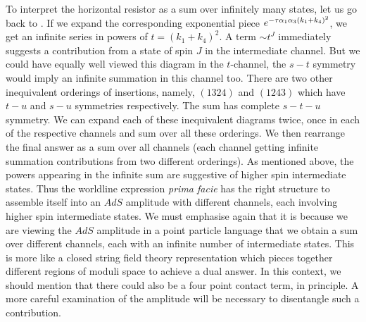 To interpret the horizontal resistor as a sum over infinitely many states, let us go back to
\gaussfour . If we expand the corresponding 
exponential piece $e^{-{\tau}{\alpha}_1{\alpha}_3(k_1+k_4)^2}$, we get an 
infinite series in powers of $t=(k_1+k_4)^2$. A term $\sim t^J$
immediately suggests a contribution from 
a state of spin $J$ in the intermediate channel. 
But we could have equally well viewed this diagram in the $t$-channel, the $s-t$
symmetry would imply an infinite summation in this channel too.
There are two other inequivalent orderings of insertions, 
namely, $(1324)$ and $(1243)$ which have $t-u$ and $s-u$ symmetries respectively. The sum has complete
$s-t-u$ symmetry. 
We can
expand each of these inequivalent diagrams twice, once in each of the respective channels and 
sum over all these orderings. We then rearrange the final answer
as a sum over all channels (each channel getting infinite summation contributions from two different 
orderings). As mentioned above, the powers appearing in the infinite
sum are suggestive of higher spin 
intermediate states. 
Thus the worldline expression
{\it prima facie} has the 
right structure to assemble itself into 
an $AdS$ amplitude with different channels, each involving higher spin intermediate states.
We must emphasise again that it is because we are viewing the $AdS$ amplitude in a point particle 
language that we obtain a sum over different channels, each with an infinite number of intermediate 
states. This is more like a closed string field theory representation which pieces together different
regions of moduli space to achieve a dual answer. 
In this context, we should mention that there could also be a four point 
contact term, in principle. A more careful examination of the amplitude will
be necessary to disentangle such a contribution.  


